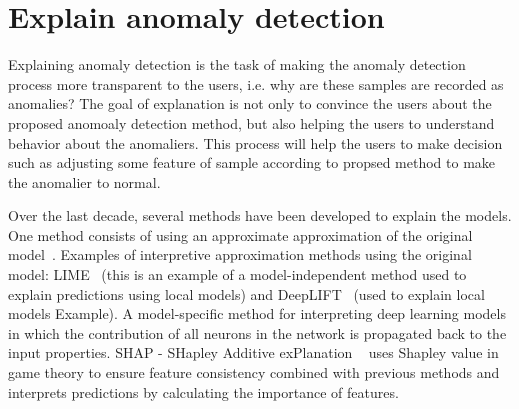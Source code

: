 \section{Explain anomaly detection}
\label{sec-explain_anomaly}
Explaining anomaly detection is the task of making
the anomaly detection process more transparent to the users,
i.e. why are these samples are recorded as anomalies?
The  goal of explanation is not only to
convince the users about the proposed anomoaly detection method,
but also helping the users to understand behavior about
the anomaliers.
This process will help the users to make decision such as
adjusting some feature of sample according to propsed method to
make the anomalier to normal.

Over the last decade,
several methods have been developed to explain the models.
One method consists of using an approximate approximation of 
the original model~\cite{lundberg2017unified}.
Examples of interpretive approximation methods using
the original model: 
LIME~\cite{ribeiro2016should} 
(this is an example of a model-independent method 
used to explain predictions using local models) and 
DeepLIFT~\cite{shrikumar2017learning} 
(used to explain local models Example).
A model-specific method for interpreting deep learning models 
in which the contribution of all neurons in the network is 
propagated back to the input properties.
SHAP - SHapley Additive exPlanation ~\cite{lundberg2017unified} uses 
Shapley value in game theory to ensure feature consistency combined
with previous methods and 
interprets predictions by calculating the importance of features.

